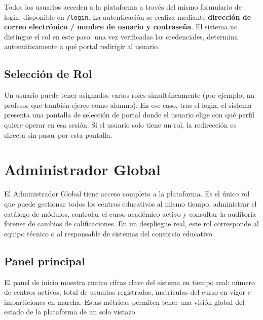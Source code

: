 \documentclass[12pt, a4paper]{report}
\begin{document}
Todos los usuarios acceden a la plataforma a través del mismo formulario de login,
disponible en \texttt{/login}. La autenticación se realiza mediante \textbf{dirección de
correo electrónico / nombre de usuario y contraseña}. El sistema no distingue el rol en este paso: una vez
verificadas las credenciales, determina automáticamente a qué portal redirigir al usuario.


\subsection{Selección de Rol}

Un usuario puede tener asignados varios roles simultáneamente (por ejemplo, un profesor
que también ejerce como alumno). En ese caso, tras el login, el sistema presenta una
pantalla de selección de portal donde el usuario elige con qué perfil quiere operar en esa
sesión. Si el usuario solo tiene un rol, la redirección es directa sin pasar por esta
pantalla.


\section{Administrador Global}

El Administrador Global tiene acceso completo a la plataforma. Es el único rol que puede
gestionar todos los centros educativos al mismo tiempo, administrar el catálogo de módulos,
controlar el curso académico activo y consultar la auditoría forense de cambios de
calificaciones. En un despliegue real, este rol corresponde al equipo técnico o al
responsable de sistemas del consorcio educativo.

\subsection{Panel principal}

El panel de inicio muestra cuatro cifras clave del sistema en tiempo real: número de
centros activos, total de usuarios registrados, matrículas del curso en vigor e
imparticiones en marcha. Estas métricas permiten tener una visión global del estado de
la plataforma de un solo vistazo.
\end{document}
